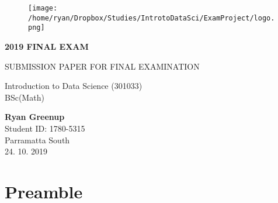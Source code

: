 \documentclass[11pt,english,a4paper,oneside]{article}
\begin{document}


\begin{titlepage}

    \begin{center}
           \begin{figure}
			\centering
			\texttt{[image: /home/ryan/Dropbox/Studies/IntrotoDataSci/ExamProject/logo.png]}
		\end{figure}

       \vspace*{1cm}

       \LARGE{ \textbf{   \uppercase{2019 Final Exam}   }}


       \large{   \uppercase{Submission Paper for Final Examination}   }

        \vspace{2cm}

         Introduction to Data Science (301033) \\ 
         \large{BSc(Math)}  \\ 

        \vspace{1cm}

         \textbf{Ryan Greenup}  \\ 
         Student ID: 1780-5315 \\ 
         Parramatta South  \\ 

         \vspace{1cm}
         24. 10. 2019 \\ 

        
         \vfill



     \end{center}
    \thispagestyle{empty}
\end{titlepage}

\newpage






\newpage
\listoftables
\newpage
\listoffigures

{
\setcounter{tocdepth}{3}
\tableofcontents
}

\newpage
{}
\hypertarget{preamble}{%
\section{Preamble}\label{preamble}}
\end{document}
